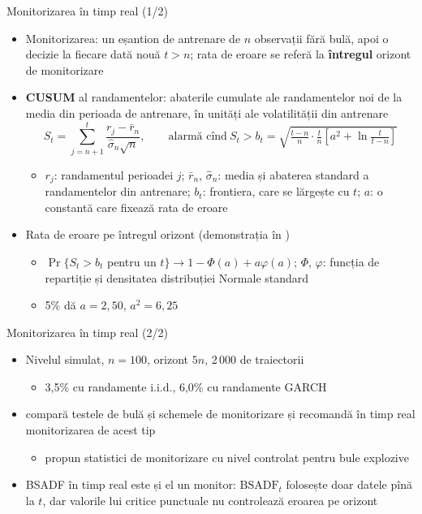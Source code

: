 \begin{frame}{Monitorizarea în timp real (1/2)}
\itemsize{\small}
\begin{itemize}
    \item Monitorizarea: un eșantion de antrenare de $n$ observații fără bulă, apoi o decizie la fiecare dată nouă $t > n$; rata de eroare se referă la \textbf{întregul} orizont de monitorizare 
    \item \textbf{CUSUM} al randamentelor: abaterile cumulate ale randamentelor noi de la media din perioada de antrenare, în unități ale volatilității din antrenare \[ S_t = \sum_{j=n+1}^{t}\frac{r_j - \bar r_n}{\hat\sigma_n\sqrt n}, \qquad \text{alarmă cînd}\ S_t > b_t = \sqrt{\tfrac{t - n}{n}\cdot\tfrac{t}{n}\left[a^2 + \ln\tfrac{t}{t - n}\right]} \]
    \begin{itemize}
        \item $r_j$: randamentul perioadei $j$; $\bar r_n$, $\hat\sigma_n$: media și abaterea standard a randamentelor din antrenare; $b_t$: frontiera, care se lărgește cu $t$; $a$: o constantă care fixează rata de eroare
    \end{itemize}
    \item Rata de eroare pe întregul orizont (demonstrația în )
    \begin{itemize}
        \item $\Pr\{S_t > b_t$ pentru un $t\} \to 1 - \Phi(a) + a\varphi(a)$; $\Phi$, $\varphi$: funcția de repartiție și densitatea distribuției Normale standard
        \item 5\% dă $a = 2{,}50$, $a^2 = 6{,}25$
    \end{itemize}
\end{itemize}
\end{frame}

\begin{frame}{Monitorizarea în timp real (2/2)}
\itemsize{\small}
\begin{itemize}
    \item Nivelul simulat, $n = 100$, orizont $5n$, 2\,000 de traiectorii
    \begin{itemize}
        \item 3{,}5\% cu randamente i.i.d., 6{,}0\% cu randamente GARCH
    \end{itemize}
    \item {} compară testele de bulă și schemele de monitorizare și recomandă în timp real monitorizarea de acest tip
    \begin{itemize}
        \item {} propun statistici de monitorizare cu nivel controlat pentru bule explozive
    \end{itemize}
    \item BSADF în timp real este și el un monitor: $\mathrm{BSADF}_t$ folosește doar datele pînă la $t$, dar valorile lui critice punctuale nu controlează eroarea pe orizont
\end{itemize}
\end{frame}

